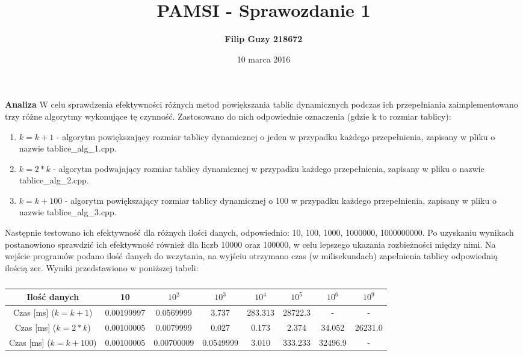 \documentclass[10pt, a4paper]{article}
\title{\textbf{PAMSI - Sprawozdanie 1}}
\author{\textbf{Filip Guzy 218672}}
\date{10 marca 2016}
\begin{document}
\maketitle

\begin{flushleft}
\textbf{Analiza} \newline \newline
W celu sprawdzenia efektywności różnych metod powiększania tablic dynamicznych podczas ich przepełniania zaimplementowano trzy różne algorytmy wykonujące tę czynność. Zastosowano do nich odpowiednie oznaczenia (gdzie k to rozmiar tablicy): 
\begin{enumerate}
\item $k=k+1$ - algorytm powiększający rozmiar tablicy dynamicznej o jeden w przypadku każdego przepełnienia, zapisany w pliku o nazwie tablice\_alg\_1.cpp. 
\item $k=2*k$ - algorytm podwajający rozmiar tablicy dynamicznej w przypadku każdego przepełnienia, zapisany w pliku o nazwie tablice\_alg\_2.cpp.
\item $k=k+100$ - algorytm powiększający rozmiar tablicy dynamicznej o 100 w przypadku każdego przepełnienia, zapisany w pliku o nazwie tablice\_alg\_3.cpp.
\end{enumerate}

Następnie testowano ich efektywność dla różnych ilości danych, odpowiednio: 10, 100, 1000, 1000000, 1000000000. Po uzyskaniu wynikach postanowiono sprawdzić ich efektywność również dla liczb 10000 oraz 100000, w celu lepszego ukazania rozbieżności między nimi. Na wejście programów podano ilość danych do wczytania, na wyjściu otrzymano czas (w milisekundach) zapełnienia tablicy odpowiednią ilością zer. Wyniki przedstawiono w poniższej tabeli:

\begin{table}[h]
\centering
\caption{}
\begin{tabular}{|c|c|c|c|c|c|c|c|} \hline
Ilość danych & 10 & $10^2$ & $10^3$ & $10^4$ & $10^5$ & $10^6$ & $10^9$ \\ \hline
Czas [ms] ($k=k+1$) & 0.00199997 & 0.0569999 & 3.737 & 283.313 & 28722.3 & - & - \\ \hline
Czas [ms] ($k=2*k$) & 0.00100005 & 0.0079999 & 0.027 & 0.173 & 2.374 & 34.052 & 26231.0 \\ \hline
Czas [ms] ($k=k+100$) & 0.00100005 & 0.00700009 & 0.0549999 & 3.010 & 333.233 & 32496.9 & - \\ \hline
\end{tabular}
\end{table}


\end{flushleft}
\end{document}
